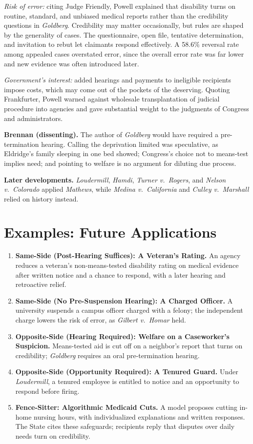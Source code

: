 \documentclass[12pt]{article}
\begin{document}
\emph{Risk of error:} citing Judge Friendly, Powell explained that disability turns on routine, standard, and unbiased medical reports rather than the credibility questions in \textit{Goldberg}. Credibility may matter occasionally, but rules are shaped by the generality of cases. The questionnaire, open file, tentative determination, and invitation to rebut let claimants respond effectively. A 58.6\% reversal rate among appealed cases overstated error, since the overall error rate was far lower and new evidence was often introduced later.

\emph{Government's interest:} added hearings and payments to ineligible recipients impose costs, which may come out of the pockets of the deserving. Quoting Frankfurter, Powell warned against wholesale transplantation of judicial procedure into agencies and gave substantial weight to the judgments of Congress and administrators.

\textbf{Brennan (dissenting).} The author of \textit{Goldberg} would have required a pre-termination hearing. Calling the deprivation limited was speculative, as Eldridge's family sleeping in one bed showed; Congress's choice not to means-test implies need; and pointing to welfare is no argument for diluting due process.

\textbf{Later developments.} \textit{Loudermill}, \textit{Hamdi}, \textit{Turner v.\ Rogers}, and \textit{Nelson v.\ Colorado} applied \textit{Mathews}, while \textit{Medina v.\ California} and \textit{Culley v.\ Marshall} relied on history instead.

\section{Examples: Future Applications}

\begin{enumerate}
\item \textbf{Same-Side (Post-Hearing Suffices): A Veteran's Rating.} An agency reduces a veteran's non-means-tested disability rating on medical evidence after written notice and a chance to respond, with a later hearing and retroactive relief.
\item \textbf{Same-Side (No Pre-Suspension Hearing): A Charged Officer.} A university suspends a campus officer charged with a felony; the independent charge lowers the risk of error, as \textit{Gilbert v.\ Homar} held.
\item \textbf{Opposite-Side (Hearing Required): Welfare on a Caseworker's Suspicion.} Means-tested aid is cut off on a neighbor's report that turns on credibility; \textit{Goldberg} requires an oral pre-termination hearing.
\item \textbf{Opposite-Side (Opportunity Required): A Tenured Guard.} Under \textit{Loudermill}, a tenured employee is entitled to notice and an opportunity to respond before firing.
\item \textbf{Fence-Sitter: Algorithmic Medicaid Cuts.} A model proposes cutting in-home nursing hours, with individualized explanations and written responses. The State cites these safeguards; recipients reply that disputes over daily needs turn on credibility.
\end{enumerate}
\end{document}
